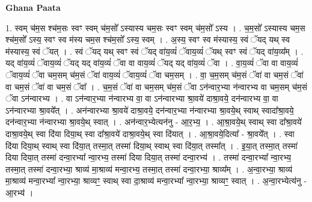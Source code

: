 \documentclass[17pt]{extarticle}
\begin{document}
\textbf{Ghana Paata } \newline

1. स्वम् च॑म॒स श्च॑म॒सः स्वꣳ स्वम् च॑म॒सो᳚ ऽस्यास्य चम॒सः स्वꣳ स्वम् च॑म॒सो᳚ ऽस्य । . च॒म॒सो᳚ ऽस्यास्य चम॒स श्च॑म॒सो᳚ ऽस्य॒ स्वꣳ स्व म॑स्य चम॒स श्च॑म॒सो᳚ ऽस्य॒ स्वम् । . अ॒स्य॒ स्वꣳ स्व म॑स्यास्य॒ स्वं ॅयद् यथ् स्व म॑स्यास्य॒ स्वं ॅयत् । . स्वं ॅयद् यथ् स्वꣳ स्वं ॅयद् वा॑य॒व्यं॑ ॅवाय॒व्यं॑ ॅयथ् स्वꣳ स्वं ॅयद् वा॑य॒व्य᳚म् । . यद् वा॑य॒व्यं॑ ॅवाय॒व्यं॑ ॅयद् यद् वा॑य॒व्यं॑ ॅवा वा वाय॒व्यं॑ ॅयद् यद् वा॑य॒व्यं॑ ॅवा । . वा॒य॒व्यं॑ ॅवा वा वाय॒व्यं॑ ॅवाय॒व्यं॑ ॅवा चम॒सम् च॑म॒सं ॅवा॑ वाय॒व्यं॑ ॅवाय॒व्यं॑ ॅवा चम॒सम् । . वा॒ च॒म॒सम् च॑म॒सं ॅवा॑ वा चम॒सं ॅवा॑ वा चम॒सं ॅवा॑ वा चम॒सं ॅवा᳚ । . च॒म॒सं ॅवा॑ वा चम॒सम् च॑म॒सं ॅवा ऽन॑न्वार॒भ्या न॑न्वारभ्य वा चम॒सम् च॑म॒सं ॅवा ऽन॑न्वारभ्य । . वा ऽन॑न्वार॒भ्या न॑न्वारभ्य वा॒ वा ऽन॑न्वारभ्या श्रा॒वये॑ दाश्रा॒वये॒ दन॑न्वारभ्य वा॒ वा ऽन॑न्वारभ्या श्रा॒वये᳚त् । . अन॑न्वारभ्या श्रा॒वये॑ दाश्रा॒वये॒ दन॑न्वार॒भ्या न॑न्वारभ्या श्रा॒वये॒थ् स्वाथ् स्वादा᳚श्रा॒वये॒ दन॑न्वार॒भ्या
न॑न्वारभ्या श्रा॒वये॒थ् स्वात् । . अन॑न्वार॒भ्येत्यन॑नु - आ॒र॒भ्य॒ । . आ॒श्रा॒वये॒थ् स्वाथ् स्वा दा᳚श्रा॒वये॑ दाश्रा॒वये॒थ् स्वा दि॑या दिया॒थ् स्वा दा᳚श्रा॒वये॑ दाश्रा॒वये॒थ् स्वा दि॑यात् । . आ॒श्रा॒वये॒दित्या᳚ - श्रा॒वये᳚त् । . स्वा दि॑या दिया॒थ् स्वाथ् स्वा दि॑या॒त् तस्मा॒त् तस्मा॑ दिया॒थ् स्वाथ् स्वा दि॑या॒त् तस्मा᳚त् । . इ॒या॒त् तस्मा॒त् तस्मा॑ दिया दिया॒त् तस्मा॑ दन्वा॒रभ्या᳚ न्वा॒रभ्य॒ तस्मा॑ दिया दिया॒त् तस्मा॑ दन्वा॒रभ्य॑ । . तस्मा॑ दन्वा॒रभ्या᳚ न्वा॒रभ्य॒ तस्मा॒त् तस्मा॑ दन्वा॒रभ्या॒ श्राव्य॑ मा॒श्राव्य॑ मन्वा॒रभ्य॒ तस्मा॒त् तस्मा॑ दन्वा॒रभ्या॒ श्राव्य᳚म् । . अ॒न्वा॒रभ्या॒ श्राव्य॑ मा॒श्राव्य॑ मन्वा॒रभ्या᳚ न्वा॒रभ्या॒ श्राव्यꣳ॒॒ स्वाथ् स्वा दा॒श्राव्य॑ 
मन्वा॒रभ्या᳚ न्वा॒रभ्या॒ श्राव्यꣳ॒॒ स्वात् । . अ॒न्वा॒रभ्येत्य॑नु - आ॒रभ्य॑ । \newline
\end{document}
